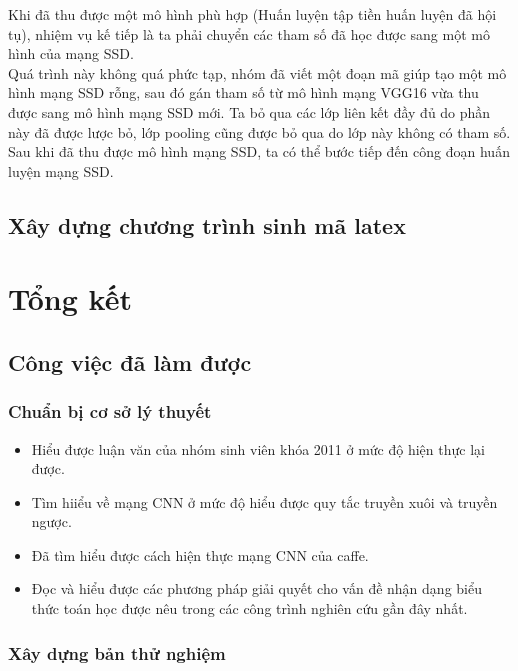 \documentclass[a4paper,12pt]{article}
\begin{document}
	Khi đã thu được một mô hình phù hợp (Huấn luyện tập tiền huấn luyện đã hội tụ), nhiệm vụ kế tiếp là ta phải chuyển các tham số đã học được sang một mô hình của mạng SSD.\\
	
	Quá trình này không quá phức tạp, nhóm đã viết một đoạn mã giúp tạo một mô hình mạng SSD rỗng, sau đó gán tham số từ mô hình mạng VGG16 vừa thu được sang mô hình mạng SSD mới. Ta bỏ qua các lớp liên kết đầy đủ do phần này đã được lược bỏ, lớp pooling cũng được bỏ qua do lớp này không có tham số. \\
	
	Sau khi đã thu được mô hình mạng SSD, ta có thể bước tiếp đến công đoạn huấn luyện mạng SSD.
	
	\subsection{Xây dựng chương trình sinh mã latex}
	
	
	\section{Tổng kết}
	\subsection{Công việc đã làm được}
	\subsubsection{Chuẩn bị cơ sở lý thuyết}
	
	\begin{itemize}
		\item Hiểu được luận văn của nhóm sinh viên khóa 2011 ở mức độ hiện thực lại được.
		\item Tìm hiiểu về mạng CNN ở mức độ hiểu được quy tắc truyền xuôi và truyền ngược.
		\item Đã tìm hiểu được cách hiện thực mạng CNN của caffe.
		\item Đọc và hiểu được các phương pháp giải quyết cho vấn đề nhận dạng biểu thức toán học được nêu trong các công trình nghiên cứu gần đây nhất.
		
	\end{itemize} 
	
	\subsubsection{Xây dựng bản thử nghiệm}
	
\end{document}
